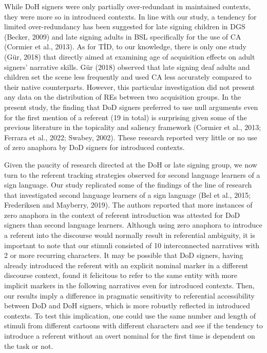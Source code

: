 \documentclass[]{elsarticle} %
\begin{document}
While DoH signers were only partially over-redundant in maintained
contexts, they were more so in introduced contexts. In line with our
study, a tendency for limited over-redundancy has been suggested for
late signing children in DGS (Becker, 2009) and late signing adults in
BSL specifically for the use of CA (Cormier et al., 2013). As for TİD,
to our knowledge, there is only one study (Gür, 2018) that directly
aimed at examining age of acquisition effects on adult signers'
narrative skills. Gür (2018) observed that late signing deaf adults and
children set the scene less frequently and used CA less accurately
compared to their native counterparts. However, this particular
investigation did not present any data on the distribution of REs
between two acquisition groups. In the present study, the finding that
DoD signers preferred to use null arguments even for the first mention
of a referent (19 in total) is surprising given some of the previous
literature in the topicality and saliency framework (Cormier et al.,
2013; Ferrara et al., 2022; Swabey, 2002). These research reported very
little or no use of zero anaphora by DoD signers for introduced
contexts.

Given the paucity of research directed at the DoH or late signing group,
we now turn to the referent tracking strategies observed for second
language learners of a sign language. Our study replicated some of the
findings of the line of research that investigated second language
learners of a sign language (Bel et al., 2015; Frederiksen and Mayberry,
2019). The authors reported that more instances of zero anaphora in the
context of referent introduction was attested for DoD signers than
second language learners. Although using zero anaphora to introduce a
referent into the discourse would normally result in referential
ambiguity, it is important to note that our stimuli consisted of 10
interconnected narratives with 2 or more recurring characters. It may be
possible that DoD signers, having already introduced the referent with
an explicit nominal marker in a different discourse context, found it
felicitous to refer to the same entity with more implicit markers in the
following narratives even for introduced contexts. Then, our results
imply a difference in pragmatic sensitivity to referential accessibility
between DoD and DoH signers, which is more robustly reflected in
introduced contexts. To test this implication, one could use the same
number and length of stimuli from different cartoons with different
characters and see if the tendency to introduce a referent without an
overt nominal for the first time is dependent on the task or not.
\end{document}
